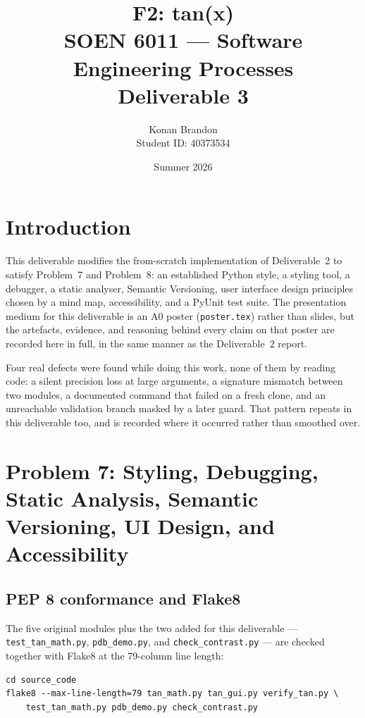 \documentclass[11pt,a4paper]{article}
\title{\textbf{F2: tan(x)}\\[0.3cm]
       \large SOEN 6011 --- Software Engineering Processes\\
       Deliverable 3}
\author{Konan Brandon\\Student ID: 40373534}
\date{Summer 2026}
\begin{document}
\maketitle
\tableofcontents
\newpage

\section{Introduction}

This deliverable modifies the from-scratch implementation of
Deliverable~2 to satisfy Problem~7 and Problem~8: an established
Python style, a styling tool, a debugger, a static analyser, Semantic
Versioning, user interface design principles chosen by a mind map,
accessibility, and a PyUnit test suite. The presentation medium for
this deliverable is an A0 poster (\texttt{poster.tex}) rather than
slides, but the artefacts, evidence, and reasoning behind every claim
on that poster are recorded here in full, in the same manner as the
Deliverable~2 report.

Four real defects were found while doing this work, none of them by
reading code: a silent precision loss at large arguments, a signature
mismatch between two modules, a documented command that failed on a
fresh clone, and an unreachable validation branch masked by a later
guard. That pattern repeats in this deliverable too, and is recorded
where it occurred rather than smoothed over.

\newpage
\section{Problem 7: Styling, Debugging, Static Analysis, Semantic
Versioning, UI Design, and Accessibility}

\subsection{PEP 8 conformance and Flake8}

The five original modules plus the two added for this deliverable ---
\texttt{test\_tan\_math.py}, \texttt{pdb\_demo.py}, and
\texttt{check\_contrast.py} --- are checked together with Flake8 at
the 79-column line length:

\begin{lstlisting}
cd source_code
flake8 --max-line-length=79 tan_math.py tan_gui.py verify_tan.py \
    test_tan_math.py pdb_demo.py check_contrast.py
\end{lstlisting}
\end{document}
